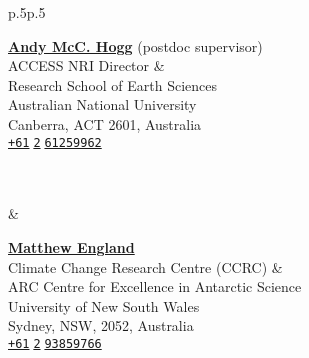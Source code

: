 \documentclass[10pt, letter]{article}
\begin{document}
\begin{tabular}{p{}p{}}
\begin{minipage}[c]{.55\textwidth}
\raggedright \href{https://scholar.google.com/citations?hl=en&user=7LMFoPMAAAAJ}{\color{black}\textbf{Andy McC. Hogg}} (postdoc supervisor)\\
ACCESS NRI Director \& \\
Research School of Earth Sciences\\
Australian National University\\
Canberra, ACT 2601, Australia\\
{}\hspace{.188cm}\texttt{\href{skype:+61261259962?sms}{+61$\;$2$\;$61259962}}\\
\hspace{-.1em}\\
\hspace{.1em}{w}\\
\mbox{}\end{minipage}%
&
\begin{minipage}[c]{.48\textwidth}
\raggedright \href{https://scholar.google.com/citations?hl=en&user=GfIm7WQAAAAJ}{\color{black}\textbf{Matthew England}}\\
Climate Change Research Centre (CCRC) \& \\
\hspace*{1em} ARC Centre for Excellence in Antarctic Science\\
University of New South Wales\\
Sydney, NSW, 2052, Australia\\
{}\hspace{.188cm}\texttt{\href{skype:+61293859766?sms}{+61$\;$2$\;$93859766}}\\
\hspace{-.1em}\\
\hspace{.1em}{w}\end{minipage}\\

\end{tabular}
\end{document}
